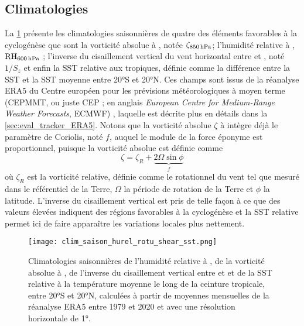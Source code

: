\documentclass[../main.tex]{subfiles}
\begin{document}
\subsection{Climatologies}\label{sec:climato_ingredients}

La \cref{fig:clim_ingredients} présente les climatologies saisonnières de quatre des éléments favorables à la cyclogénèse que sont la vorticité absolue à
, notée $\zeta_{\text{\hPa{850}}}$; l'humidité relative à , $\text{RH}_{\text{\hPa{600}}}$ ; l'inverse du cisaillement vertical du vent
horizontal entre  et , noté $1/S_z$ et enfin la SST relative aux tropiques, définie comme la différence entre la SST et la SST moyenne entre
\ang{20}S et \ang{20}N. Ces champs sont issus de la réanalyse ERA5 du Centre européen pour les prévisions météorologiques à moyen terme (CEPMMT, ou juste CEP ;
en anglais \textit{European Centre for Medium-Range Weather Forecasts}, ECMWF) \parencite{hersbach_era5_2020}, laquelle est décrite plus en détails dans la
\cref{sec:eval_tracker_ERA5}. Notons que la vorticité absolue $\zeta$ à  intègre déjà le paramètre de Coriolis, noté $f$, auquel le module de la force
éponyme est proportionnel, puisque la vorticité absolue est définie comme
%
\begin{equation*}
    \zeta = \zeta_R + \underbrace{2 \Omega \sin \phi}_{f}
\end{equation*}
%
où $\zeta_R$ est la vorticité relative, définie comme le rotationnel du vent tel que mesuré dans le référentiel de la Terre, $\Omega$ la période de
rotation de la Terre et $\phi$ la latitude. L'inverse du cisaillement vertical est pris de telle façon à ce que des valeurs élevées indiquent des régions
favorables à la cyclogénèse et la SST relative permet ici de faire apparaître les variations locales plus nettement.

\begin{figure}[tp]
    \centering
    \texttt{[image: clim\_saison\_hurel\_rotu\_shear\_sst.png]}
    \caption{Climatologies saisonnières de l'humidité relative à , de la vorticité absolue à , de l'inverse du cisaillement vertical entre
     et  et de la SST relative à la température moyenne le long de la ceinture tropicale, entre \ang{20}S et \ang{20}N, calculées à partir de
    moyennes mensuelles de la réanalyse ERA5 entre 1979 et 2020 et avec une résolution horizontale de \ang{1}.}
    \label{fig:clim_ingredients}
\end{figure}
\end{document}
